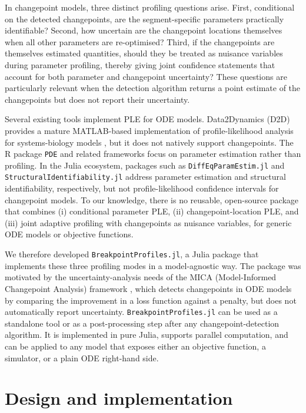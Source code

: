 \documentclass[10pt,letterpaper]{article}
\begin{document}
In changepoint models, three distinct profiling questions arise. First, conditional on the detected changepoints, are the segment-specific parameters practically identifiable? Second, how uncertain are the changepoint locations themselves when all other parameters are re-optimised? Third, if the changepoints are themselves estimated quantities, should they be treated as nuisance variables during parameter profiling, thereby giving joint confidence statements that account for both parameter and changepoint uncertainty? These questions are particularly relevant when the detection algorithm returns a point estimate of the changepoints but does not report their uncertainty.

Several existing tools implement PLE for ODE models. Data2Dynamics (D2D) provides a mature MATLAB-based implementation of profile-likelihood analysis for systems-biology models \cite{d2d2015}, but it does not natively support changepoints. The R package \texttt{PDE} and related frameworks focus on parameter estimation rather than profiling. In the Julia ecosystem, packages such as \texttt{DiffEqParamEstim.jl} and \texttt{StructuralIdentifiability.jl} address parameter estimation and structural identifiability, respectively, but not profile-likelihood confidence intervals for changepoint models. To our knowledge, there is no reusable, open-source package that combines (i) conditional parameter PLE, (ii) changepoint-location PLE, and (iii) joint adaptive profiling with changepoints as nuisance variables, for generic ODE models or objective functions.

We therefore developed \texttt{BreakpointProfiles.jl}, a Julia package that implements these three profiling modes in a model-agnostic way. The package was motivated by the uncertainty-analysis needs of the MICA (Model-Informed Changepoint Analysis) framework \cite{mica}, which detects changepoints in ODE models by comparing the improvement in a loss function against a penalty, but does not automatically report uncertainty. \texttt{BreakpointProfiles.jl} can be used as a standalone tool or as a post-processing step after any changepoint-detection algorithm. It is implemented in pure Julia, supports parallel computation, and can be applied to any model that exposes either an objective function, a simulator, or a plain ODE right-hand side.

\section*{Design and implementation}
\end{document}
